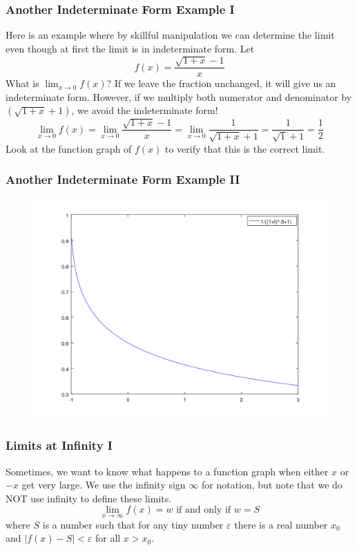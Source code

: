 \documentclass[xcolor=dvipsnames]{beamer}
\begin{document}
\begin{frame}
  \frametitle{Another Indeterminate Form Example I}
  Here is an example where by skillful manipulation we can determine
  the limit even though at first the limit is in indeterminate form.
  Let
\begin{equation}
  \label{eq:xierigai}
  f(x)=\frac{\sqrt{1+x}-1}{x}
\end{equation}
What is $\lim_{x\rightarrow{}0}f(x)$? If we leave the fraction
unchanged, it will give us an indeterminate form. However, if we
multiply both numerator and denominator by $(\sqrt{1+x}+1)$, we avoid
the indeterminate form!
\begin{equation}
  \label{eq:ciabohmi}
  \lim_{x\rightarrow{}0}f(x)=\lim_{x\rightarrow{}0}\frac{\sqrt{1+x}-1}{x}=\lim_{x\rightarrow{}0}\frac{1}{\sqrt{1+x}+1}=\frac{1}{\sqrt{1}+1}=\frac{1}{2}
\end{equation}
Look at the function graph of $f(x)$ to verify that this is the
correct limit.
\end{frame}

\begin{frame}
  \frametitle{Another Indeterminate Form Example II}
  \begin{figure}[h]
    \includegraphics[scale=.5]{./diagrams/indeterminate.png}
  \end{figure}
\end{frame}

\begin{frame}
  \frametitle{Limits at Infinity I}
Sometimes, we want to know what happens to a function graph when
either $x$ or $-x$ get very large. We use the infinity sign $\infty$
for notation, but note that we do NOT use infinity to define these
limits. 
\begin{equation}
  \label{eq:xetieshe}
  \lim_{x\rightarrow{}\infty}f(x)=w\mbox{ if and only if }w=S
\end{equation}
where $S$ is a number such that for any tiny number $\varepsilon$
there is a real number $x_{0}$ and
$\vert{}f(x)-S\vert<\varepsilon$ for all $x>x_{0}$.
\end{frame}
\end{document}
